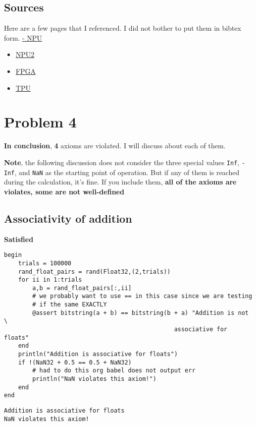 \documentclass[11pt]{article}
\begin{document}
\subsection{Sources}
\label{sec:org3032b6c}
Here are a few pages that I referenced. I did not bother to put them in bibtex
form.
\href{https://en.wikichip.org/wiki/neural\_processor}{- NPU}
\begin{itemize}
\item \href{https://www.utmel.com/blog/categories/integrated\%20circuit/neural-processing-unit-npu-explained}{NPU2}
\item \href{https://www.arm.com/zh-TW/glossary/fpga}{FPGA}
\item \href{https://en.wikipedia.org/wiki/Tensor\_Processing\_Unit}{TPU}
\end{itemize}

\section{Problem 4}
\label{sec:org78a5428}
\textbf{In conclusion}, \textbf{4} axioms are violated. I will discuss about each of them.

\textbf{Note}, the following discussion does not consider the three special values
\texttt{Inf}, \texttt{-Inf}, and \texttt{NaN} as the starting point of operation. But if any of them
is reached during the calculation, it's fine. If you include them, \textbf{all of the
axioms are violates, some are not well-defined}

\subsection{Associativity of addition}
\label{sec:org9e0ce83}
\textbf{Satisfied}

\begin{verbatim}
begin
    trials = 100000
    rand_float_pairs = rand(Float32,(2,trials))
    for ii in 1:trials
        a,b = rand_float_pairs[:,ii]
        # we probably want to use == in this case since we are testing
        # if the same EXACTLY
        @assert bitstring(a + b) == bitstring(b + a) "Addition is not \
                                                associative for floats"
    end
    println("Addition is associative for floats")
    if !(NaN32 + 0.5 == 0.5 + NaN32)
        # had to do this org babel does not output err
        println("NaN violates this axiom!")
    end
end
\end{verbatim}

\begin{verbatim}
Addition is associative for floats
NaN violates this axiom!
\end{verbatim}
\end{document}
